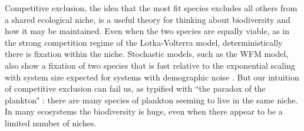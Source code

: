 \documentclass[a4paper,10pt]{article}
\numberwithin{equation}{section} %
\begin{document}
Competitive exclusion, the idea that the most fit species excludes all others from a shared ecological niche, is a useful theory for thinking about biodiversity and how it may be maintained. %
Even when the two species are equally viable, as in the strong competition regime of the Lotka-Volterra model, deterministically there is fixation within the niche. 
Stochastic models, such as the WFM model, also show a fixation of two species that is fast relative to the exponential scaling with system size expected for systems with demographic noise \cite{Ovaskainen2010}. 
But our intuition of competitive exclusion can fail us, as typified with ``the paradox of the plankton" \cite{Hutchinson1961,Chesson2000}: there are many species of plankton seeming to live in the same niche. 
In many ecosystems the biodiversity is huge, even when there appear to be a limited number of niches. 
\end{document}
